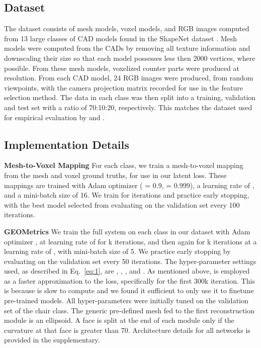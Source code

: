 \documentclass{article}
\begin{document}
\subsection{Dataset}

The dataset consists of mesh models, voxel models, and RGB images computed from 13 large classes of CAD models found in the ShapeNet dataset \cite{ShapeNet}. Mesh models were computed from the CADs by removing all texture information and downscaling their size so that each model possesses less then 2000 vertices, where possible. From these mesh models, voxelized counter parts were produced at  resolution. From each CAD model, 24 RGB images were produced, from random viewpoints, with the camera projection matrix recorded for use in the feature selection method. The data in each class was then split into a training, validation and test set with a ratio of 70:10:20, respectively. This matches the dataset used for empirical evaluation by \citet{Pixel2Mesh} and \citet{mineNIPS}. 


\subsection{Implementation Details} 
\textbf{Mesh-to-Voxel Mapping} \enskip For each class, we train a mesh-to-voxel mapping from the mesh and voxel ground truths, for use in our latent loss. These mappings are trained with Adam optimizer \cite{kingma2014adam} ( = 0.9,  = 0.999), a learning rate of , and a mini-batch size of 16. We train for  iterations and practice early stopping, with the best model selected from evaluating on the validation set every 100 iterations. 

\textbf{GEOMetrics} \enskip We train the full system on each class in our dataset with Adam optimizer \cite{kingma2014adam}, at learning rate of  for k iterations, and then again for k iterations at a learning rate of , with mini-batch size of 5. We practice early stopping by evaluating on the validation set every 50 iterations. The hyper-parameter settings used, as described in Eq.~\eqref{eq:1}, are , ,  , and . As mentioned above,  
 is employed as a faster approximation to the  loss, specifically for the first 300k iteration. This is because  is slow to compute and we found it sufficient to only use it to finetune pre-trained models. All hyper-parameters were initially tuned on the validation set of the chair class.  The generic pre-defined mesh fed to the first reconstruction module is an ellipsoid. A face is split at the end of each module only if the curvature at that face is greater than 70\textdegree. Architecture details for all networks is provided in the supplementary. 
\end{document}
